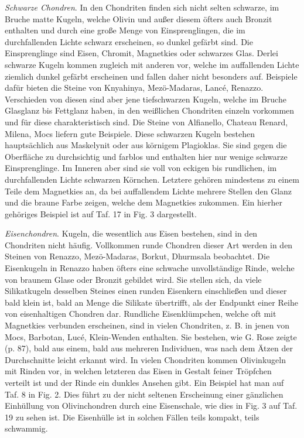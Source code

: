 \documentclass[a4paper, 12pt, oneside]{article}
\begin{document}
\emph{Schwarze Chondren}. In den Chondriten finden sich nicht selten schwarze, im Bruche matte Kugeln, welche Olivin und außer diesem öfters auch Bronzit enthalten und durch eine große Menge von Einsprenglingen, die im durchfallenden Lichte schwarz erscheinen, so dunkel gefärbt sind. Die Einsprenglinge sind Eisen, Chromit, Magnetkies oder schwarzes Glas. Derlei schwarze Kugeln kommen zugleich mit anderen vor, welche im auffallenden Lichte ziemlich dunkel gefärbt erscheinen und fallen daher nicht besonders auf. Beispiele dafür bieten die Steine von Knyahinya, Mezö-Madaras, Lancé, Renazzo. Verschieden von diesen sind aber jene tiefschwarzen Kugeln, welche im Bruche Glasglanz bis Fettglanz haben, in den weißlichen Chondriten einzeln vorkommen und für diese charakteristisch sind. Die Steine von Alfianello, Chateau Renard, Milena, Mocs liefern gute Beispiele. Diese schwarzen Kugeln bestehen hauptsächlich aus Maskelynit oder aus körnigem Plagioklas. Sie sind gegen die Oberfläche zu durchsichtig und farblos und enthalten hier nur wenige schwarze Einsprenglinge. Im Inneren aber sind sie voll von eckigen bis rundlichen, im durchfallenden Lichte schwarzen Körnchen. Letztere gehören mindestens zu einem Teile dem Magnetkies an, da bei auffallendem Lichte mehrere Stellen den Glanz und die braune Farbe zeigen, welche dem Magnetkies zukommen. Ein hierher gehöriges Beispiel ist auf Taf. 17 in Fig. 3 dargestellt.

\emph{Eisenchondren}. Kugeln, die wesentlich aus Eisen bestehen, sind in den Chondriten nicht häufig. Vollkommen runde Chondren dieser Art werden in den Steinen von Renazzo, Mezö-Madaras, Borkut, Dhurmsala beobachtet. Die Eisenkugeln in Renazzo haben öfters eine schwache unvollständige Rinde, welche von braunem Glase oder Bronzit gebildet wird. Sie stellen sich, da viele Silikatkugeln desselben Steines einen runden Eisenkern einschließen und dieser bald klein ist, bald an Menge die Silikate übertrifft, als der Endpunkt einer Reihe von eisenhaltigen Chondren dar. Rundliche Eisenklümpchen, welche oft mit Magnetkies verbunden erscheinen, sind in vielen Chondriten, z. B. in jenen von Mocs, Barbotan, Lucé, Klein-Wenden enthalten. Sie bestehen, wie G. Rose zeigte (p. 87), bald aus einem, bald aus mehreren Individuen, was nach dem Ätzen der Durchschnitte leicht erkannt wird. In vielen Chondriten kommen Olivinkugeln mit Rinden vor, in welchen letzteren das Eisen in Gestalt feiner Tröpfchen verteilt ist und der Rinde ein dunkles Ansehen gibt. Ein Beispiel hat man auf Taf. 8 in Fig. 2. Dies führt zu der nicht seltenen Erscheinung einer gänzlichen Einhüllung von Olivinchondren durch eine Eisenschale, wie dies in Fig. 3 auf Taf. 19 zu sehen ist. Die Eisenhülle ist in solchen Fällen teils kompakt, teils schwammig.
\end{document}
